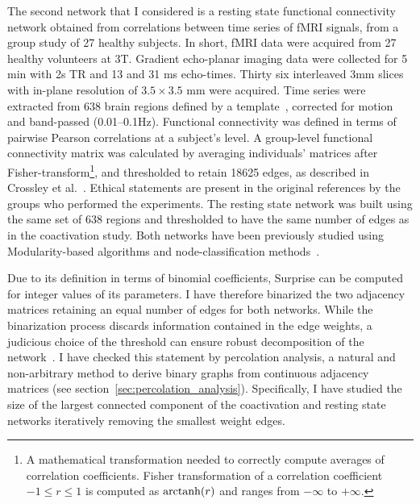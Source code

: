 The second network that I considered is a resting state functional connectivity network obtained from correlations between time series of fMRI signals, from a group study of 27 healthy subjects. In short, fMRI data were acquired from 27 healthy volunteers at 3T. Gradient echo-planar imaging data were collected for 5 min with 2s TR and 13 and 31 ms echo-times. Thirty six interleaved 3mm slices with in-plane resolution of $3.5\times 3.5$ mm were acquired. 
Time series were extracted from 638 brain regions defined by a template~\cite{crossley2013a}, corrected for motion and band-passed (0.01–0.1Hz).
Functional connectivity was defined in terms of pairwise Pearson correlations at a subject's level.
A group-level functional connectivity matrix was calculated by averaging individuals' matrices after Fisher-transform\footnote{A mathematical transformation needed to correctly compute averages of correlation coefficients. Fisher transformation of a correlation coefficient $-1 \leq r \leq 1$ is computed as $\operatorname{arctanh}(r)$ and ranges from $-\infty$ to $+\infty$.}, and thresholded to retain 18625 edges, as described in Crossley et al.~\cite{crossley2013a}.
Ethical statements are present in the original references by the groups who performed the experiments. 
The resting state network was built using the same set of 638 regions and thresholded to have the same number of edges as in the coactivation study.
Both networks have been previously studied using Modularity-based algorithms and node-classification methods~\cite{crossley2013a}.

Due to its definition in terms of binomial coefficients, Surprise can be computed for integer values of its parameters.
I have therefore binarized the two adjacency matrices retaining an equal number of edges for both networks.
While the binarization process discards information contained in the edge weights, a judicious choice of the threshold can ensure robust decomposition of the network~\cite{meunier2010,he2009}.
I have checked this statement by percolation analysis, a natural and non-arbitrary method to derive binary graphs from continuous adjacency matrices (see section~\ref{sec:percolation_analysis}).
Specifically, I have studied the size of the largest connected component of the coactivation and resting state networks iteratively removing the smallest weight edges.


